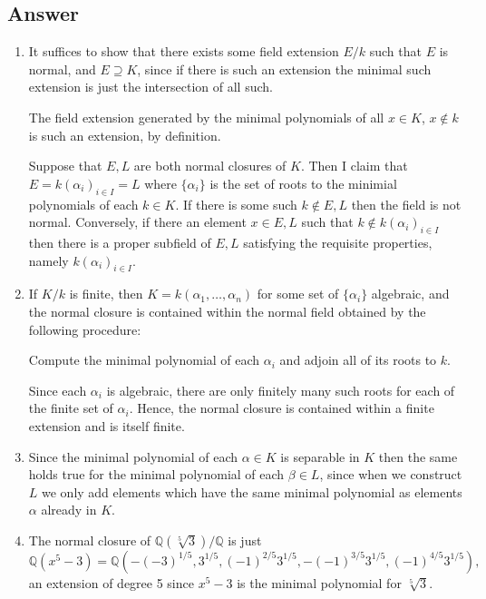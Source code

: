 \documentclass[11pt]{article}
\begin{document}
\subsection{Answer}
\begin{enumerate}
\item It suffices to show that there exists some field extension $E/k$ such that $E$ is normal, and $E \supseteq K$, since if there is such an extension the minimal such extension is just the intersection of all such.

The field extension generated by the minimal polynomials of all $x \in K$, $x \notin k$ is such an extension, by definition.

Suppose that $E, L$ are both normal closures of $K$. Then I claim that $E = k(\alpha_i)_{i \in I} = L$ where $\{\alpha_i\}$ is the set of roots to the minimial polynomials of each $k \in K$. If there is some such $k \notin E, L$ then the field is not normal. Conversely, if there an element $x \in E,L$ such that $k \notin k(\alpha_i)_{i \in I}$ then there is a proper subfield of $E,L$ satisfying the requisite properties, namely $k(\alpha_i)_{i \in I}$.


\item If $K/k$ is finite, then $K = k(\alpha_1, \dots, \alpha_n)$ for some set of $\{\alpha_i\}$ algebraic, and the normal closure is contained within the normal field obtained by the following procedure:

Compute the minimal polynomial of each $\alpha_i$ and adjoin all of its roots to $k$.

Since each $\alpha_i$ is algebraic, there are only finitely many such roots for each of the finite set of $\alpha_i$. Hence, the normal closure is contained within a  finite extension and is itself finite.

\item Since the minimal polynomial of each $\alpha \in K$ is separable in $K$ then the same holds true for the minimal polynomial of each $\beta \in L$, since when we construct $L$ we only add elements which have the same minimal polynomial as elements $\alpha$ already in $K$.

\item The normal closure of $\mathbb{Q}(\sqrt[5]{3})/\mathbb{Q}$ is just \[\mathbb{Q}(x^5-3) = \mathbb{Q } \left( -(-3)^{1/5}, 3^{1/5}, (-1)^{2/5} 3^{1/5}, -(-1)^{3/5} 3^{1/5}, (-1)^{4/5} 3^{1/5}\right),\] an extension of degree 5 since $x^5-3$ is the minimal polynomial for $\sqrt[5]{3}$.
\end{enumerate}
\end{document}
